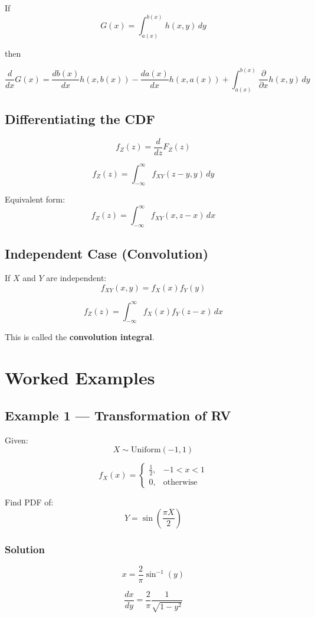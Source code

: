 \documentclass[11pt]{article}
\begin{document}
If
\[
G(x)=\int_{a(x)}^{b(x)} h(x,y)\,dy
\]

then

\[
\frac{d}{dx}G(x)
=
\frac{db(x)}{dx}h(x,b(x))
-
\frac{da(x)}{dx}h(x,a(x))
+
\int_{a(x)}^{b(x)}
\frac{\partial}{\partial x}h(x,y)\,dy
\]

\subsection{Differentiating the CDF}

\[
f_Z(z)=\frac{d}{dz}F_Z(z)
\]

\[
f_Z(z)=\int_{-\infty}^{\infty}
f_{XY}(z-y,y)\,dy
\]

Equivalent form:
\[
f_Z(z)=\int_{-\infty}^{\infty}
f_{XY}(x,z-x)\,dx
\]

\subsection{Independent Case (Convolution)}

If $X$ and $Y$ are independent:
\[
f_{XY}(x,y)=f_X(x)f_Y(y)
\]

\[
f_Z(z)=\int_{-\infty}^{\infty}
f_X(x)f_Y(z-x)\,dx
\]

This is called the \textbf{convolution integral}.

\section{Worked Examples}

\subsection{Example 1 — Transformation of RV}

Given:
\[
X \sim \text{Uniform}(-1,1)
\]

\[
f_X(x)=
\begin{cases}
\frac12, & -1<x<1 \\
0, & \text{otherwise}
\end{cases}
\]

Find PDF of:
\[
Y=\sin\left(\frac{\pi X}{2}\right)
\]

\subsubsection*{Solution}

\[
x=\frac{2}{\pi}\sin^{-1}(y)
\]

\[
\frac{dx}{dy}=\frac{2}{\pi}\frac{1}{\sqrt{1-y^2}}
\]
\end{document}

